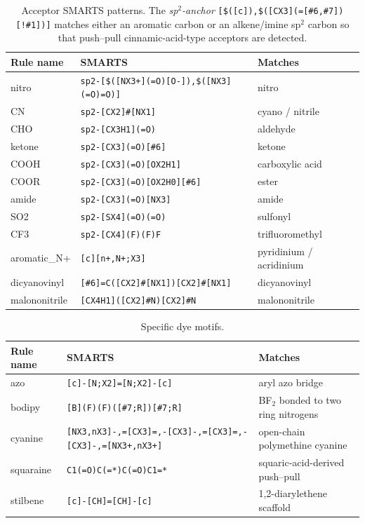 \documentclass[journal=jcisd8,manuscript=suppinfo]{achemso}
\begin{document}
\begin{table}[htbp]
\centering
\caption{Acceptor SMARTS patterns. The \emph{sp$^2$-anchor} \texttt{[\$([c]),\$([CX3](=[\#6,\#7])[!\#1])]} matches either an aromatic carbon or an alkene/imine sp$^2$ carbon so that push--pull cinnamic-acid-type acceptors are detected.}
\label{tab:si_acceptor_smarts}
\small
\begin{tabular}{lll}
\toprule
\textbf{Rule name} & \textbf{SMARTS} & \textbf{Matches} \\
\midrule
nitro & \verb|sp2-[$([NX3+](=O)[O-]),$([NX3](=O)=O)]| & nitro \\
CN & \verb|sp2-[CX2]#[NX1]| & cyano / nitrile \\
CHO & \verb|sp2-[CX3H1](=O)| & aldehyde \\
ketone & \verb|sp2-[CX3](=O)[#6]| & ketone \\
COOH & \verb|sp2-[CX3](=O)[OX2H1]| & carboxylic acid \\
COOR & \verb|sp2-[CX3](=O)[OX2H0][#6]| & ester \\
amide & \verb|sp2-[CX3](=O)[NX3]| & amide \\
SO2 & \verb|sp2-[SX4](=O)(=O)| & sulfonyl \\
CF3 & \verb|sp2-[CX4](F)(F)F| & trifluoromethyl \\
aromatic\_N+ & \verb|[c][n+,N+;X3]| & pyridinium / acridinium \\
dicyanovinyl & \verb|[#6]=C([CX2]#[NX1])[CX2]#[NX1]| & dicyanovinyl \\
malononitrile & \verb|[CX4H1]([CX2]#N)[CX2]#N| & malononitrile \\
\bottomrule
\end{tabular}
\end{table}

\begin{table}[htbp]
\centering
\caption{Specific dye motifs.}
\label{tab:si_motif_smarts}
\scriptsize
\begin{tabular}{lll}
\toprule
\textbf{Rule name} & \textbf{SMARTS} & \textbf{Matches} \\
\midrule
azo & \verb|[c]-[N;X2]=[N;X2]-[c]| & aryl azo bridge \\
bodipy & \verb|[B](F)(F)([#7;R])[#7;R]| & BF$_2$ bonded to two ring nitrogens \\
cyanine & \verb|[NX3,nX3]-,=[CX3]=,-[CX3]-,=[CX3]=,-[CX3]-,=[NX3+,nX3+]| & open-chain polymethine cyanine \\
squaraine & \verb|C1(=O)C(=*)C(=O)C1=*| & squaric-acid-derived push--pull \\
stilbene & \verb|[c]-[CH]=[CH]-[c]| & 1,2-diarylethene scaffold \\
\bottomrule
\end{tabular}
\end{table}
\end{document}

